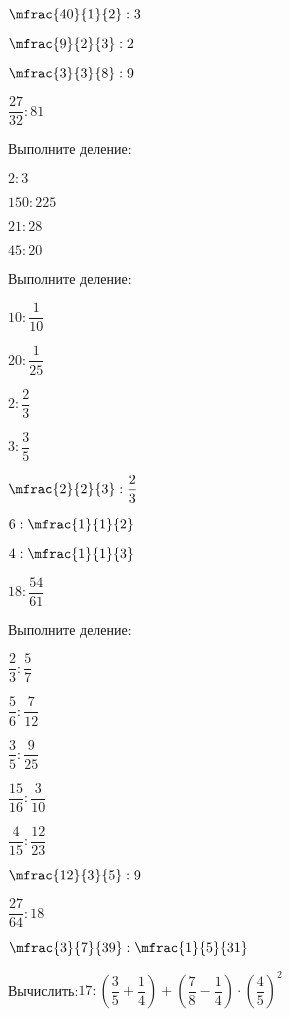 \begin{class}[number=3]
\begin{listofex}
		\begin{enumcols}[itemcolumns=4]
			\item \( \mfrac{40}{1}{2}:3 \)
			\item \( \mfrac{9}{2}{3}:2 \)
			\item \( \mfrac{3}{3}{8}:9 \)
			\item \( \dfrac{27}{32}:81 \)
		\end{enumcols}
		\item Выполните деление:
		\begin{enumcols}[itemcolumns=4]
			\item \( 2:3 \)
			\item \( 150:225 \)
			\item \( 21:28 \)
			\item \( 45:20 \)
		\end{enumcols}
		\item Выполните деление:
		\begin{enumcols}[itemcolumns=4]
			\item \( 10:\dfrac{1}{10} \)
			\item \( 20:\dfrac{1}{25} \)
			\item \( 2:\dfrac{2}{3} \)
			\item \( 3:\dfrac{3}{5} \)
			\item \( \mfrac{2}{2}{3}:\dfrac{2}{3} \)
			\item \( 6:\mfrac{1}{1}{2} \)
			\item \( 4:\mfrac{1}{1}{3} \)
			\item \( 18:\dfrac{54}{61} \)
		\end{enumcols}
		\item Выполните деление:
		\begin{enumcols}[itemcolumns=4]
			\item \( \dfrac{2}{3}:\dfrac{5}{7} \)
			\item \( \dfrac{5}{6}:\dfrac{7}{12} \)
			\item \( \dfrac{3}{5}:\dfrac{9}{25} \)
			\item \( \dfrac{15}{16}:\dfrac{3}{10} \)
			\item \( \dfrac{4}{15}:\dfrac{12}{23} \)
			\item \( \mfrac{12}{3}{5}:9 \)
			\item \( \dfrac{27}{64}:18 \)
			\item \( \mfrac{3}{7}{39}:\mfrac{1}{5}{31} \)
		\end{enumcols}
		\item Вычислить:\quad\( 17:\left( \dfrac{3}{5}+\dfrac{1}{4} \right)+\left( \dfrac{7}{8}-\dfrac{1}{4} \right)\cdot\left( \dfrac{4}{5} \right)^2 \)
	\end{listofex}
\end{class}
